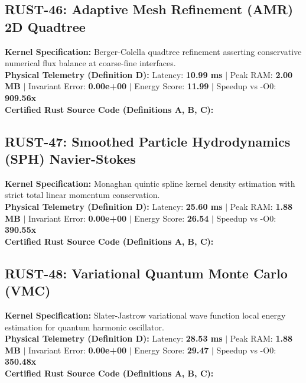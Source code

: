 \vspace{1em}
\subsection{RUST-46: Adaptive Mesh Refinement (AMR) 2D Quadtree}
\textbf{Kernel Specification:} Berger-Colella quadtree refinement asserting conservative numerical flux balance at coarse-fine interfaces.\\
\textbf{Physical Telemetry (Definition D):} Latency: \textbf{10.99 ms} $|$ Peak RAM: \textbf{2.00 MB} $|$ Invariant Error: \textbf{0.00e+00} $|$ Energy Score: \textbf{11.99} $|$ Speedup vs -O0: \textbf{909.56x}\\

\textbf{Certified Rust Source Code (Definitions A, B, C):}


\vspace{1em}
\subsection{RUST-47: Smoothed Particle Hydrodynamics (SPH) Navier-Stokes}
\textbf{Kernel Specification:} Monaghan quintic spline kernel density estimation with strict total linear momentum conservation.\\
\textbf{Physical Telemetry (Definition D):} Latency: \textbf{25.60 ms} $|$ Peak RAM: \textbf{1.88 MB} $|$ Invariant Error: \textbf{0.00e+00} $|$ Energy Score: \textbf{26.54} $|$ Speedup vs -O0: \textbf{390.55x}\\

\textbf{Certified Rust Source Code (Definitions A, B, C):}


\vspace{1em}
\subsection{RUST-48: Variational Quantum Monte Carlo (VMC)}
\textbf{Kernel Specification:} Slater-Jastrow variational wave function local energy estimation for quantum harmonic oscillator.\\
\textbf{Physical Telemetry (Definition D):} Latency: \textbf{28.53 ms} $|$ Peak RAM: \textbf{1.88 MB} $|$ Invariant Error: \textbf{0.00e+00} $|$ Energy Score: \textbf{29.47} $|$ Speedup vs -O0: \textbf{350.48x}\\

\textbf{Certified Rust Source Code (Definitions A, B, C):}


